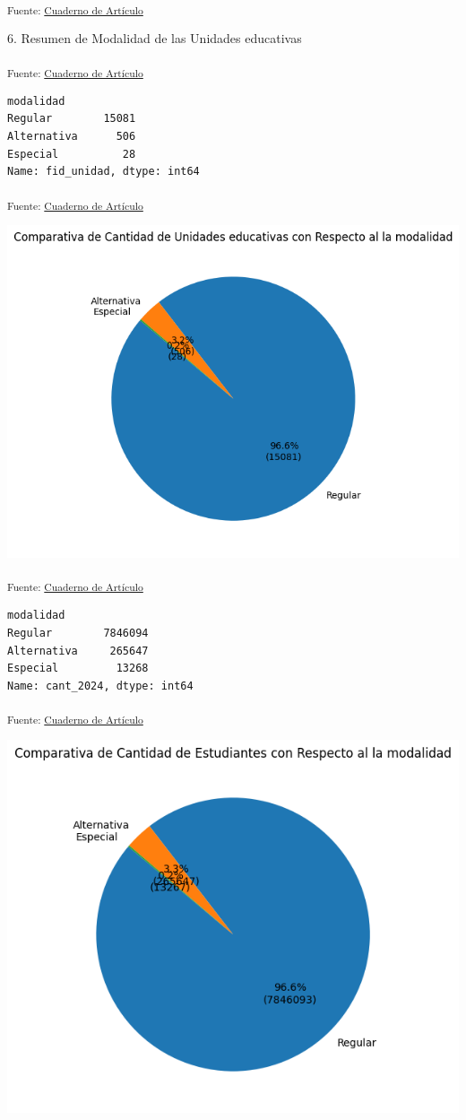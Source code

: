 \documentclass[
  12pt]{article}
\begin{document}
\textsubscript{Fuente: \href{sociest.org/index.ipynb.html}{Cuaderno de
Artículo}}

6. Resumen de Modalidad de las Unidades educativas

\textsubscript{Fuente: \href{sociest.org/index.ipynb.html}{Cuaderno de
Artículo}}

\begin{verbatim}
modalidad
Regular        15081
Alternativa      506
Especial          28
Name: fid_unidad, dtype: int64
\end{verbatim}

\textsubscript{Fuente: \href{sociest.org/index.ipynb.html}{Cuaderno de
Artículo}}

\includegraphics{index_files/figure-pdf/cell-29-output-1.png}

\textsubscript{Fuente: \href{sociest.org/index.ipynb.html}{Cuaderno de
Artículo}}

\begin{verbatim}
modalidad
Regular        7846094
Alternativa     265647
Especial         13268
Name: cant_2024, dtype: int64
\end{verbatim}

\textsubscript{Fuente: \href{sociest.org/index.ipynb.html}{Cuaderno de
Artículo}}

\includegraphics{index_files/figure-pdf/cell-31-output-1.png}
\end{document}
